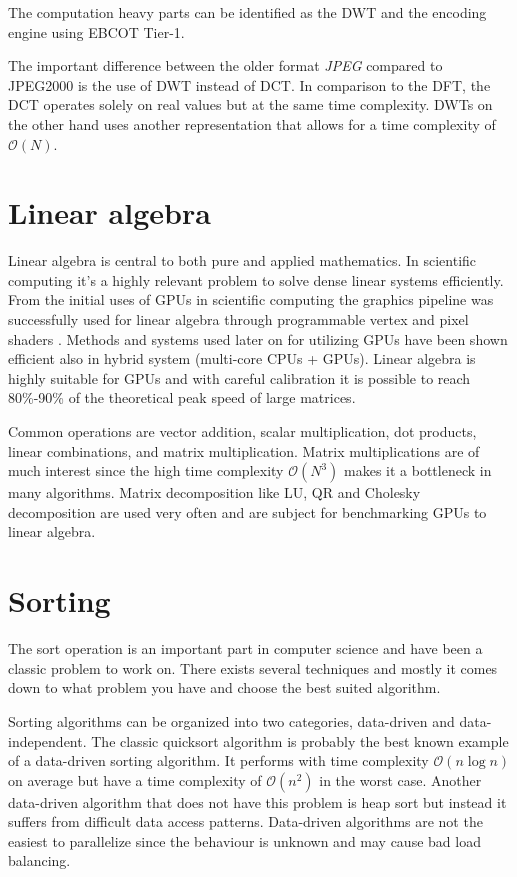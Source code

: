 The computation heavy parts can be identified as the \gls{DWT} and the encoding engine using \gls{EBCOT} Tier-1.

The important difference between the older format \emph{JPEG} compared to JPEG2000 is the use of \gls{DWT} instead of \gls{DCT}. In comparison to the \gls{DFT}, the \gls{DCT} operates solely on real values but at the same time complexity. \gls{DWT}s on the other hand uses another representation that allows for a time complexity of $\mathcal{O}(N)$.

\section{Linear algebra}
Linear algebra is central to both pure and applied mathematics. In scientific computing it's a highly relevant problem to solve dense linear systems efficiently. From the initial uses of GPUs in scientific computing the graphics pipeline was successfully used for linear algebra through programmable vertex and pixel shaders \cite{kruger2003linear}. Methods and systems used later on for utilizing \gls{GPU}s have been shown efficient also in hybrid system (multi-core \gls{CPU}s + \gls{GPU}s)\cite{tomov2010dense}. Linear algebra is highly suitable for \gls{GPU}s and with careful calibration it is possible to reach 80\%-90\% of the theoretical peak speed of large matrices\cite{volkov2008benchmarking}.

Common operations are vector addition, scalar multiplication, dot products, linear combinations, and matrix multiplication. Matrix multiplications are of much interest since the high time complexity $\mathcal{O}(N^3)$ makes it a bottleneck in many algorithms. Matrix decomposition like LU, QR and Cholesky decomposition are used very often and are subject for benchmarking \gls{GPU}s to linear algebra\cite{volkov2008benchmarking}.

\section{Sorting}
The sort operation is an important part in computer science and have been a classic problem to work on. There exists several techniques and mostly it comes down to what problem you have and choose the best suited algorithm.

Sorting algorithms can be organized into two categories, data-driven and data-independent. The classic quicksort algorithm is probably the best known example of a data-driven sorting algorithm. It performs with time complexity $\mathcal{O}(n\log{n})$ on average but have a time complexity of $\mathcal{O}(n^2)$ in the worst case. Another data-driven algorithm that does not have this problem is heap sort but instead it suffers from difficult data access patterns. Data-driven algorithms are not the easiest to parallelize since the behaviour is unknown and may cause bad load balancing.

